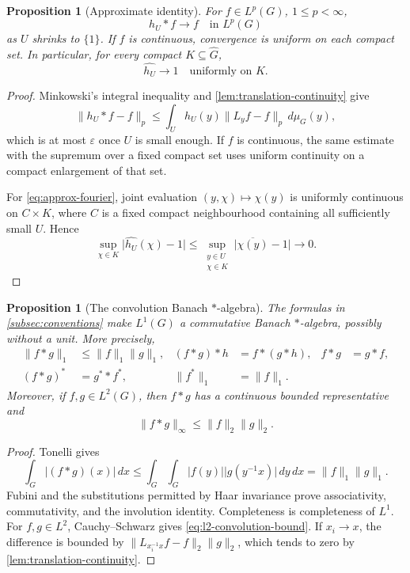 \documentclass[11pt]{article}
\newtheorem{proposition}[theorem]{Proposition}
\theoremstyle{definition}
\theoremstyle{remark}
\newcommand{\Lp}[1]{L^{#1}}
\newcommand{\dual}[1]{\widehat{#1}}
\newcommand{\abs}[1]{\lvert #1\rvert}
\newcommand{\norm}[1]{\lVert #1\rVert}
\begin{document}
\begin{proposition}[Approximate identity]
\label{prop:approximate-identity}
For $f\in\Lp p(G)$, $1\leq p<\infty$,
\[
  h_U*f\longrightarrow f\quad\text{in }\Lp p(G)
\]
as $U$ shrinks to $\{1\}$.  If $f$ is continuous, convergence is uniform on each
compact set.  In particular, for every compact $K\subseteq\dual G$,
\begin{equation}
  \widehat{h_U}\longrightarrow1
  \quad\text{uniformly on }K.
  \label{eq:approx-fourier}
\end{equation}
\end{proposition}

\begin{proof}
Minkowski's integral inequality and \cref{lem:translation-continuity} give
\[
 \norm{h_U*f-f}_p
 \leq\int_Uh_U(y)\norm{L_yf-f}_p\,d\mu_G(y),
\]
which is at most $\varepsilon$ once $U$ is small enough.  If $f$ is continuous, the same
estimate with the supremum over a fixed compact set uses uniform continuity on a compact
enlargement of that set.

For \eqref{eq:approx-fourier}, joint evaluation
$(y,\chi)\mapsto\chi(y)$ is uniformly continuous on $C\times K$, where $C$ is a fixed
compact neighbourhood containing all sufficiently small $U$.  Hence
\[
 \sup_{\chi\in K}\abs{\widehat{h_U}(\chi)-1}
 \leq \sup_{\substack{y\in U\\\chi\in K}}
       \abs{\overline{\chi(y)}-1}\longrightarrow0.
\]
\end{proof}

\begin{proposition}[The convolution Banach $*$-algebra]
\label{prop:l1-banach-algebra}
The formulas in \cref{subsec:conventions} make $\Lp1(G)$ a commutative Banach
$*$-algebra, possibly without a unit.  More precisely,
\begin{align*}
 \norm{f*g}_1&\leq\norm f_1\norm g_1,&
 (f*g)*h&=f*(g*h),& f*g&=g*f,\\
 (f*g)^*&=g^**f^*,& \norm{f^*}_1&=\norm f_1.
\end{align*}
Moreover, if $f,g\in\Lp2(G)$, then $f*g$ has a continuous bounded representative and
\begin{equation}
  \norm{f*g}_\infty\leq\norm f_2\norm g_2.
  \label{eq:l2-convolution-bound}
\end{equation}
\end{proposition}

\begin{proof}
Tonelli gives
\[
 \int_G\abs{(f*g)(x)}\,dx
 \leq\int_G\int_G\abs{f(y)}\abs{g(y^{-1}x)}\,dy\,dx
 =\norm f_1\norm g_1.
\]
Fubini and the substitutions permitted by Haar invariance prove associativity,
commutativity, and the involution identity.  Completeness is completeness of $\Lp1$.
For $f,g\in\Lp2$, Cauchy--Schwarz gives \eqref{eq:l2-convolution-bound}.  If $x_i\to x$,
the difference is bounded by $\norm{L_{x_i^{-1}x}f-f}_2\norm g_2$, which tends to zero
by \cref{lem:translation-continuity}.
\end{proof}
\end{document}
